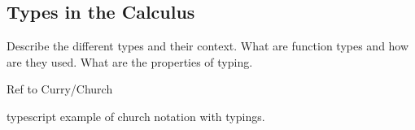 \subsection{Types in the Calculus}

Describe the different types and their context.
What are function types and how are they used.
What are the properties of typing.

Ref to Curry/Church

typescript example of church notation with typings.
